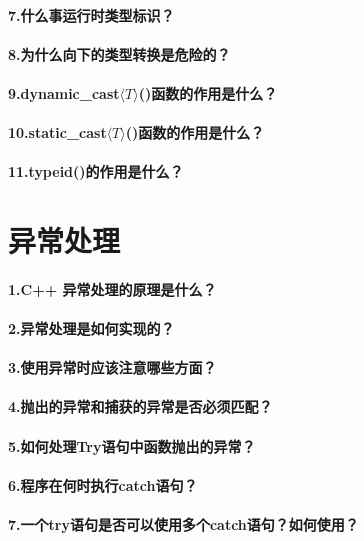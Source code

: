 \documentclass[UTF8,a4paper,8pt]{ctexart}
\begin{document}
 	 \paragraph{7.什么事运行时类型标识？}
 	 \paragraph{8.为什么向下的类型转换是危险的？}
 	 \paragraph{9.dynamic\_cast$\langle T \rangle $()函数的作用是什么？}
 	 \paragraph{10.static\_cast$\langle T \rangle $()函数的作用是什么？}
 	 \paragraph{11.typeid()的作用是什么？} 

\section*{异常处理}
	 \paragraph{1.C++ 异常处理的原理是什么？} 
	 \paragraph{2.异常处理是如何实现的？}
	 \paragraph{3.使用异常时应该注意哪些方面？}
	 \paragraph{4.抛出的异常和捕获的异常是否必须匹配？}
	 \paragraph{5.如何处理Try语句中函数抛出的异常？}
	 \paragraph{6.程序在何时执行catch语句？}
	 \paragraph{7.一个try语句是否可以使用多个catch语句？如何使用？}
\end{document}
